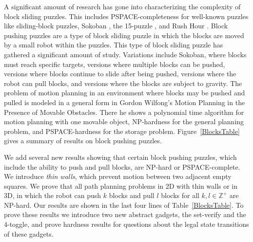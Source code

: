 A significant amount of research has gone into characterizing the complexity of block sliding puzzles. This includes PSPACE-completeness for well-known puzzles like sliding-block puzzles\cite{hearn2005pspace}, Sokoban \cite{Sokoban98, DZ96}, the 15-puzzle \cite{15Puzzle}, and Rush Hour \cite{RushHour02}. Block pushing puzzles are a type of block sliding puzzle in which the blocks are moved by a small robot within the puzzles. This type of block sliding puzzle has gathered a significant amount of study. Variations include Sokoban\cite{Sokoban98, DZ96}, where blocks must reach specific targets, versions where multiple blocks can be pushed\cite{Push100, Push*00, Push2F02}, versions where blocks continue to slide after being pushed\cite{PushPushk04, Push*00}, versions where the robot can pull blocks\cite{Pull10}, and versions where the blocks are subject to gravity\cite{Gravity}. The problem of motion planning in an environment where blocks may be pushed and pulled is modeled in a general form in Gordon Wilfong's Motion Planning in the Presence of Movable Obstacles\cite{PushPull91}. There he shows a polynomial time algorithm for motion planning with one movable object, NP-hardness for the general planning problem, and PSPACE-hardness for the storage problem. Figure~\ref{BlocksTable} gives a summary of results on block pushing puzzles. 



We add several new results showing that certain block pushing puzzles, which include the ability to push and pull blocks, are NP-hard or PSPACE-complete. We introduce \emph{thin walls}, which prevent motion between two adjacent empty squares. We prove that all path planning problems in 2D with thin walls or in 3D, in which the robot can push $k$ blocks and pull $l$ blocks for all $k,l \in \mathbb{Z}^+$ are NP-hard. Our results are shown in the last four lines of Table~\ref{BlocksTable}. To prove these results we introduce two new abstract gadgets, the set-verify and the 4-toggle, and prove hardness results for questions about the legal state transitions of these gadgets. %


